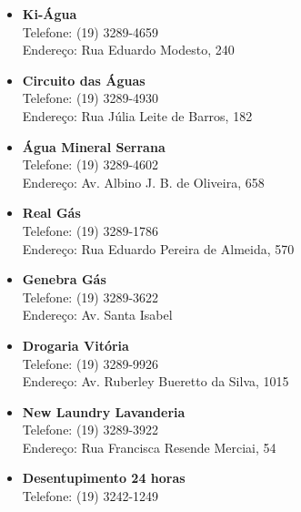 \begin{itemize}
    \item  \textbf{Ki-Água}
        \\Telefone: (19) 3289-4659
        \\Endereço: Rua Eduardo Modesto, 240

    \item  \textbf{Circuito das Águas}
        \\Telefone: (19) 3289-4930
        \\Endereço: Rua Júlia Leite de Barros, 182

    \item  \textbf{Água Mineral Serrana}
        \\Telefone: (19) 3289-4602
        \\Endereço: Av. Albino J. B. de Oliveira, 658

    \item  \textbf{Real Gás}
        \\Telefone: (19) 3289-1786
        \\Endereço: Rua Eduardo Pereira de Almeida, 570

    \item  \textbf{Genebra Gás}
        \\Telefone: (19) 3289-3622
        \\Endereço: Av. Santa Isabel

    \item  \textbf{Drogaria Vitória}
        \\Telefone: (19) 3289-9926
        \\Endereço: Av. Ruberley Bueretto da Silva, 1015



    \item  \textbf{New Laundry Lavanderia}
        \\Telefone: (19) 3289-3922
        \\Endereço: Rua Francisca Resende Merciai, 54

    \item  \textbf{Desentupimento 24 horas}
        \\Telefone: (19) 3242-1249


\end{itemize}
